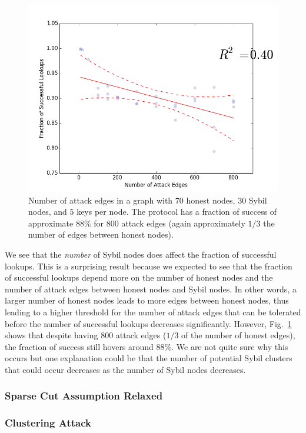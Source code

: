 \documentclass[letter]{article}
\begin{document}
\begin{figure}[!h]
\centering
\includegraphics[width=0.9\columnwidth]{sybilattackedges30}
\caption{Number of attack edges in a graph with $70$ honest nodes, $30$ Sybil nodes, and $5$ keys per node. The protocol has a fraction of success of approximate $88\%$ for $800$ attack edges (again approximately $1/3$ the number of edges between honest nodes).}
\label{fig:sybilattackedges30}
\end{figure}

We see that the \emph{number} of Sybil nodes does affect the fraction of successful lookups. This is a surprising result because we expected to see that the fraction of successful lookups depend more on the number of honest nodes and the number of attack edges between honest nodes and Sybil nodes. In other words, a larger number of honest nodes leads to more edges between honest nodes, thus leading to a higher threshold for the number of attack edges that can be tolerated before the number of successful lookups decreases significantly. However, Fig.~\ref{fig:sybilattackedges30} shows that despite having $800$ attack edges ($1/3$ of the number of honest edges), the fraction of success still hovers around $88\%$. We are not quite sure why this occurs but one explanation could be that the number of potential Sybil clusters that could occur decreases as the number of Sybil nodes decreases.

\subsubsection{Sparse Cut Assumption Relaxed}

\subsubsection{Clustering Attack}
\end{document}
